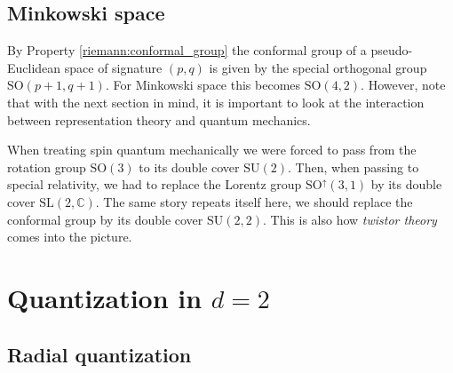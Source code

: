 \subsection{Minkowski space}

    By Property \ref{riemann:conformal_group} the conformal group of a pseudo-Euclidean space of signature $(p,q)$ is given by the special orthogonal group $\mathrm{SO}(p+1,q+1)$. For Minkowski space this becomes $\mathrm{SO}(4,2)$. However, note that with the next section in mind, it is important to look at the interaction between representation theory and quantum mechanics.

    When treating spin quantum mechanically we were forced to pass from the rotation group $\mathrm{SO}(3)$ to its double cover $\mathrm{SU}(2)$. Then, when passing to special relativity, we had to replace the Lorentz group $\mathrm{SO}^\uparrow(3,1)$ by its double cover $\mathrm{SL}(2,\mathbb{C})$. The same story repeats itself here, we should replace the conformal group by its double cover $\mathrm{SU}(2,2)$. This is also how \textit{twistor theory} comes into the picture.

\section{\texorpdfstring{Quantization in $d=2$}{Quantization in d = 2}}
\subsection{Radial quantization}

